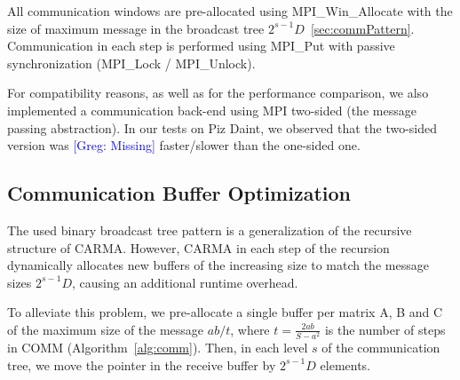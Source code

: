 \documentclass[sigplan,review,anonymous,10pt]{acmart}\settopmatter{printfolios=true,printccs=false,printacmref=false}
\newcommand\greg[1]{\textcolor{blue}{[Greg: #1]}}
\begin{document}
All communication windows are 
pre-allocated using \linebreak MPI\_Win\_Allocate with the size of maximum 
message in the 
broadcast tree $2^{s-1} D$~\cref{sec:commPattern}. Communication in each 
step is performed using MPI\_Put with passive synchronization (MPI\_Lock / 
MPI\_Unlock).

For compatibility reasons, as well as for the performance comparison, we also 
implemented a communication back-end using MPI two-sided (the message passing 
abstraction). In our tests on Piz Daint, we observed that the two-sided version 
was \greg{Missing} faster/slower than the one-sided one.


\subsection{Communication Buffer Optimization}
\label{sec:bufferReuse}
The used binary broadcast tree pattern is a generalization 
of 
the recursive structure of CARMA. However, CARMA in each step of the 
recursion dynamically allocates new buffers of the increasing size to match the 
message sizes $2^{s-1} D$, causing an additional runtime overhead.

To alleviate this problem, we pre-allocate a 
single buffer per matrix A, B and C of the maximum size of the message $ab/t$, 
where $t = \frac{2ab}{S - a^2}$ is the number of steps in COMM 
(Algorithm~\ref{alg:comm}). Then, in each level $s$ of the communication tree, 
we  move the pointer in the receive buffer by $2^{s-1} D$ elements.
\end{document}

